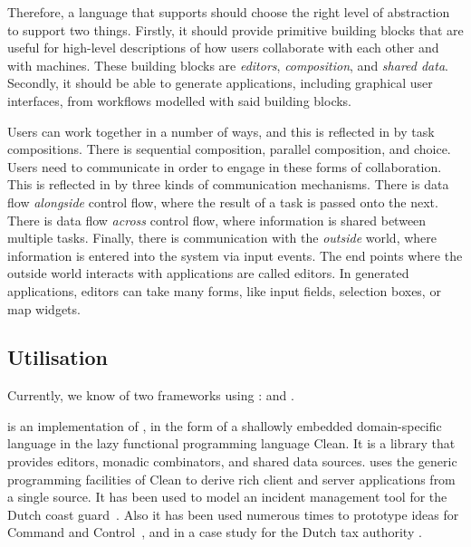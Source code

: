 Therefore,
a language that supports \TOP should choose the right level of abstraction to support two things.
Firstly, it should provide primitive building blocks that are useful for high-level descriptions of how users collaborate with each other and with machines.
These building blocks are \emph{editors}, \emph{composition}, and \emph{shared data}.
Secondly, it should be able to generate applications, including graphical user interfaces, from workflows modelled with said building blocks.

Users can work together in a number of ways, and this is reflected in \TOP by task compositions.
There is sequential composition, parallel composition, and choice.
Users need to communicate in order to engage in these forms of collaboration.
This is reflected in \TOP by three kinds of communication mechanisms.
There is data flow \emph{alongside} control flow, where the result of a task is passed onto the next.
There is data flow \emph{across} control flow, where information is shared between multiple tasks.
Finally, there is communication with the \emph{outside} world, where information is entered into the system via input events.
The end points where the outside world interacts with \TOP applications are called editors.
In generated applications, editors can take many forms, like input fields, selection boxes, or map widgets.



\subsection{Utilisation}


Currently, we know of two frameworks using \TOP: \ITASKS and \MTASKS.

\ITASKS is an implementation of \TOP, in the form of a shallowly embedded domain-specific language in the lazy functional programming language Clean.
It is a library that provides editors, monadic combinators, and shared data sources.
\ITASKS uses the generic programming facilities of Clean to derive rich client and server applications from a single source.
It has been used to model an incident management tool for the Dutch coast guard~\cite{conf/iscram/LijnseJP12}.
Also it has been used numerous times to prototype ideas for Command and Control~\cite{theses/nlda/Kool17, theses/radboud/Stutterheim17}, and in a case study for the Dutch tax authority \cite{conf/sfp/StutterheimAP17}.

